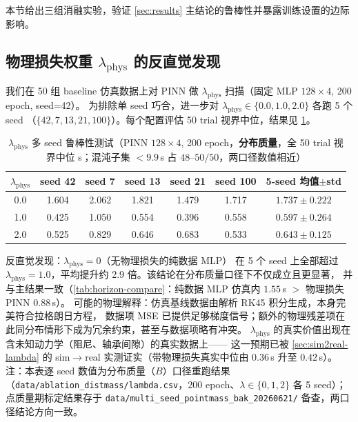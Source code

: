 \documentclass[a4paper,12pt]{ctexart}   %
\renewcommand{\emph}[1]{#1}
\begin{document}
本节给出三组消融实验，验证 \cref{sec:results} 主结论的鲁棒性并暴露训练设置的边际影响。

\subsection{物理损失权重 $\lambda_{\mathrm{phys}}$ 的反直觉发现}
\label{sec:ablation-lambda}

我们在 50 组 baseline 仿真数据上对 PINN 做 $\lambda_{\mathrm{phys}}$ 扫描（固定 MLP $128 \times 4$, 200 epoch, seed=42）。
为排除单 seed 巧合，进一步对 $\lambda_{\mathrm{phys}} \in \{0.0, 1.0, 2.0\}$ 各跑 5 个 seed
（$\{42, 7, 13, 21, 100\}$）。每个配置评估 50 trial 视界中位，结果见 \cref{tab:ablation-lambda}。

\begin{table}[h]
\centering
\caption{$\lambda_{\mathrm{phys}}$ 多 seed 鲁棒性测试（PINN $128 \times 4$, 200 epoch，\textbf{分布质量}，全 50 trial 视界中位 s；混沌子集 $<9.9$\,s 占 $48\text{--}50/50$，两口径数值相近）}
\label{tab:ablation-lambda}
\begin{tabular}{ccccccc}
\toprule
$\lambda_{\mathrm{phys}}$ & seed 42 & seed 7 & seed 13 & seed 21 & seed 100 & 5-seed 均值$\pm$std \\
\midrule
0.0 & 1.604 & 2.062 & 1.821 & 1.479 & 1.717 & $1.737 \pm 0.222$ \\
1.0 & 0.425 & 1.050 & 0.554 & 0.396 & 0.558 & $0.597 \pm 0.264$ \\
2.0 & 0.525 & 0.829 & 0.646 & 0.683 & 0.533 & $0.643 \pm 0.125$ \\
\bottomrule
\end{tabular}
\end{table}

\noindent \emph{反直觉发现：}$\lambda_{\mathrm{phys}} = 0$（无物理损失的纯数据 MLP）
在 5 个 seed 上全部超过 $\lambda_{\mathrm{phys}} = 1.0$，平均提升约 2.9 倍。该结论在分布质量口径下不仅成立且更显著，
并与主结果一致（\cref{tab:horizon-compare}：纯数据 MLP 仿真内 $1.55$\,s $>$ 物理损失 PINN $0.88$\,s）。
可能的物理解释：仿真基线数据由解析 RK45 积分生成，本身完美符合拉格朗日方程，
数据项 MSE 已提供足够梯度信号；额外的物理残差项在此同分布情形下成为冗余约束，甚至与数据项略有冲突。
$\lambda_{\mathrm{phys}}$ 的真实价值出现在含未知动力学（阻尼、轴承间隙）的\emph{真实}数据上——
这一预期已被 \cref{sec:sim2real-lambda} 的 sim$\to$real 实测证实（带物理损失真实中位由 $0.36$\,s 升至 $0.42$\,s）。
\emph{注：}本表逐 seed 数值为分布质量（$B$）口径重跑结果
（\texttt{data/ablation\_distmass/lambda.csv}，200 epoch、$\lambda\in\{0,1,2\}$ 各 5 seed）；
点质量期标定结果存于 \texttt{data/multi\_seed\_pointmass\_bak\_20260621/} 备查，两口径结论方向一致。
\end{document}
